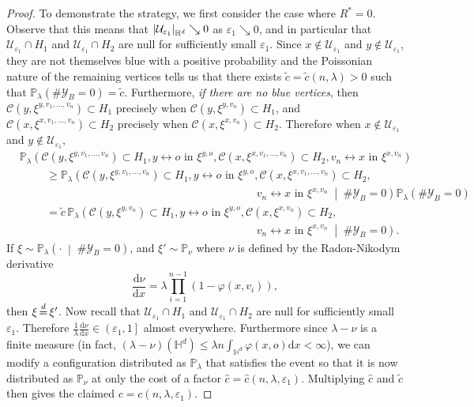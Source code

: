 \documentclass[10pt,a4paper,dvipsnames]{article}
\theoremstyle{definition}
\theoremstyle{remark}
\newcommand{\pla}{\mathbb P_\lambda}
\newcommand{\Ycal}{\mathcal{Y}}
\newcommand{\Ucal}{\mathcal{U}}
\newcommand{\HypDim}{{\mathbb{H}^d}}
\newcommand{\dd}{\mathrm{d}} %
\newcommand{\C}{\mathscr {C}}
\newcommand{\dequal}{\,{\buildrel d \over =}\,}
\newcommand{\conn}[3]{#1 \longleftrightarrow #2\textrm { in } #3}
\DeclarePairedDelimiter\abs{\lvert}{\rvert}
\newcommand{\habsd}[1]{\abs*{#1}_\HypDim}
\newcommand{\orig}{o}
\newcommand{\connf}{\varphi}
\numberwithin{equation}{section}
\begin{document}
\begin{proof}
    To demonstrate the strategy, we first consider the case where $R^*=0$. Observe that this means that $\habsd{\Ucal_{\varepsilon_1}}\searrow 0$ as $\varepsilon_1\searrow0$, and in particular that $\Ucal_{\varepsilon_1}\cap  H_1$ and $\Ucal_{\varepsilon_1}\cap  H_2$ are null for sufficiently small $\varepsilon_1$. Since $x\not\in\Ucal_{\varepsilon_1}$ and $y\not\in\Ucal_{\varepsilon_1}$, they are not themselves blue with a positive probability and the Poissonian nature of the remaining vertices tells us that there exists $\tilde c=\tilde c(n,\lambda)>0$ such that $\pla\left(\#\Ycal_B=0\right)= \tilde c$. Furthermore, \emph{if there are no blue vertices}, then $\C\left(y,\xi^{y,v_1,\ldots,v_n}\right)\subset  H_1$ precisely when $\C\left(y,\xi^{y,v_n}\right)\subset  H_1$, and $ \C\left(x,\xi^{x,v_1,\ldots,v_n}\right)\subset  H_2$ precisely when $ \C\left(x,\xi^{x,v_n}\right)\subset  H_2$. Therefore when $x\not\in\Ucal_{\varepsilon_1}$ and $y\not\in\Ucal_{\varepsilon_1}$,
    \begin{align}
        &\pla\left(\C\left(y,\xi^{y,v_1,\ldots,v_n}\right)\subset  H_1, \conn{y}{\orig}{\xi^{y,\orig}}, \C\left(x,\xi^{x,v_1,\ldots,v_n}\right)\subset  H_2,\conn{v_n}{x}{\xi^{x,v_n}}\right)\nonumber\\
        &\hspace{1cm}\geq\pla\left(\C\left(y,\xi^{y,v_1,\ldots,v_n}\right)\subset  H_1, \conn{y}{\orig}{\xi^{y,\orig}}, \C\left(x,\xi^{x,v_1,\ldots,v_n}\right)\subset  H_2,\right.\nonumber\\
        &\hspace{9cm}\left.\conn{v_n}{x}{\xi^{x,v_n}}\;\middle|\;\#\Ycal_B =0\right) \pla\left(\#\Ycal_B =0\right)\nonumber\\
        &\hspace{1cm} = \tilde c \,\pla\left(\C\left(y,\xi^{y,v_n}\right)\subset  H_1, \conn{y}{\orig}{\xi^{y,\orig}}, \C\left(x,\xi^{x,v_n}\right)\subset  H_2,\right.\nonumber\\
        &\hspace{9cm}\left.\conn{v_n}{x}{\xi^{x,v_n}}\;\middle|\;\#\Ycal_B =0\right).
    \end{align}
    If $\xi\sim \pla\left(\cdot \;\middle|\;\#\Ycal_B = 0\right)$, and $\xi'\sim \mathbb{P}_{\nu}$ where $\nu$ is defined by the Radon-Nikodym derivative
    \begin{equation}
        \frac{\dd \nu}{\dd x} = \lambda\prod^{n-1}_{i=1}\left(1-\connf(x,v_i)\right),
    \end{equation}
    then $\xi\dequal \xi'$. Now recall that $\Ucal_{\varepsilon_1}\cap  H_1$ and $\Ucal_{\varepsilon_1}\cap  H_2$ are null for sufficiently small $\varepsilon_1$. Therefore $\frac{1}{\lambda}\frac{\dd \nu}{\dd x}\in\left(\varepsilon_1,1\right]$ almost everywhere. Furthermore since $\lambda-\nu$ is a finite measure (in fact, $\left(\lambda-\nu\right)\left(\HypDim\right)\leq \lambda n \int_\HypDim\connf(x,\orig)\dd x<\infty$), we can modify a configuration distributed as $\pla$ that satisfies the event so that it is now distributed as $\mathbb{P}_\nu$ at only the cost of a factor $\hat c=\hat c(n,\lambda,\varepsilon_1)$. Multiplying $\hat c$ and $\tilde c$ then gives the claimed $c=c(n,\lambda,\varepsilon_1)$.


\end{proof}
\end{document}
